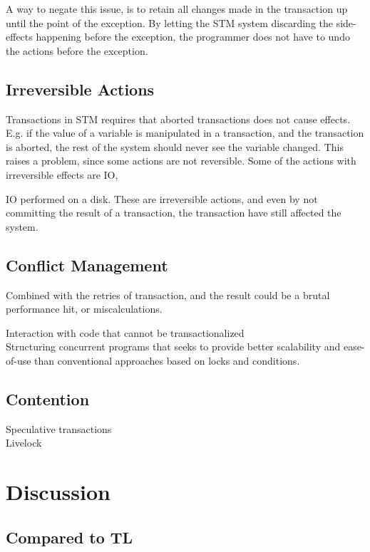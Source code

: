 A way to negate this issue, is to retain all changes made in the transaction up until the point of the exception. By letting the \ac{STM} system discarding the side-effects happening before the exception, the programmer does not have to undo the actions before the exception. 

\subsection{Irreversible Actions}
Transactions in \ac{STM} requires that aborted transactions does not cause effects. E.g. if the value of a variable is manipulated in a transaction, and the transaction is aborted, the rest of the system should never see the variable changed. This raises a problem, since some actions are not reversible. Some of the actions with irreversible effects are \ac{IO}, 	


\ac{IO} performed on a disk. These are irreversible actions, and even by not committing the result of a transaction, the transaction have still affected the system. 


\subsection{Conflict Management}
Combined with the retries of transaction, and the result could be a brutal performance hit, or miscalculations.

Interaction with code that cannot be transactionalized\\

Structuring concurrent programs that seeks to provide better scalability and ease-of-use than conventional approaches based on locks and conditions.


\subsection{Contention}

Speculative transactions\\
Livelock\\





\section{Discussion}
\label{sec:stm_discussion}

\subsection{Compared to TL}

